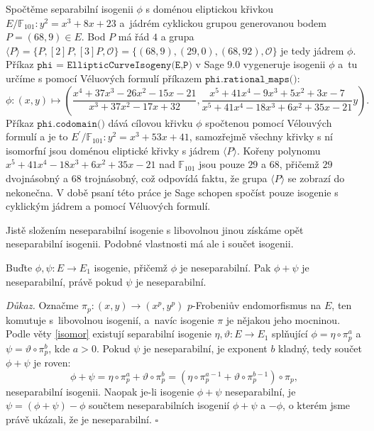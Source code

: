 \documentclass[12pt]{report}
\begin{document}
\begin{priklad}
Spočtěme separabilní isogenii $\phi$ s doménou eliptickou křivkou $E/\mathbb{F}_{101} : y^2 = x^3+8x+23$ a~jádrém cyklickou grupou generovanou bodem $P =(68,9) \in E$. Bod $P$ má řád $4$ a grupa $\langle P \rangle = \lbrace P,[2]P,[3]P,\mathcal{O}\rbrace = \lbrace (68,9),(29,0), (68,92),\mathcal{O} \rbrace$ je tedy jádrem $\phi$. Příkaz $\texttt{phi = EllipticCurveIsogeny(E,P)}$ v Sage 9.0 vygeneruje isogenii $\phi$ a~tu určíme s pomocí Véluových formulí příkazem $\texttt{phi.rational\_maps()}$:
\begin{equation*}
\phi : (x,y) \longmapsto \left(\frac{x^4 + 37 x^3 - 26 x^2 - 15x - 21}{x^3 + 37 x^2 - 17 x + 32},\frac{x^5 + 41 x^4 - 9 x^3 + 5 x^2 + 3x - 7}{x^5 + 41 x^4 - 18 x^3 + 6 x^2 + 35x - 21} y  \right). 
\end{equation*}
Příkaz $\texttt{phi.codomain()}$ dává cílovou křivku $\phi$ spočtenou pomocí Vélouvých formulí a je to $E^\prime/\mathbb{F}_{101} : y^2 = x^3 + 53 x + 41$, samozřejmě všechny křivky s ní isomorfní jsou doménou eliptické křivky s jádrem $\langle P \rangle$. Kořeny polynomu $x^5 + 41 x^4 - 18 x^3 + 6 x^2 + 35x - 21$ nad $\mathbb{F}_{101}$ jsou pouze $29$ a $68$, přičemž $29$ dvojnásobný a $68$ trojnásobný, což odpovídá faktu, že grupa $\langle P \rangle$ se zobrazí do nekonečna. V době psaní této práce je Sage schopen spočíst pouze isogenie s cyklickým jádrem a pomocí Véluových formulí.
\end{priklad}

Jistě složením neseparabilní isogenie s libovolnou jinou získáme opět neseparabilní isogenii. Podobné vlastnosti má ale i součet isogenii.
\begin{veta}\label{separsum}
Buďte $\phi,\psi : E \longrightarrow E_1$ isogenie, přičemž $\phi$ je neseparabilní. Pak $\phi+\psi$ je neseparabilní, právě pokud $\psi$ je neseparabilní.
\end{veta}
\noindent \textit{Důkaz.} Označme $\pi_p : (x,y) \rightarrow (x^p,y^p)$ $p$-Frobeniův endomorfismus na $E$, ten komutuje s~libovolnou isogenií, a~navíc isogenie $\pi$ je nějakou jeho mocninou. Podle věty \ref{isomor} existují separabilní isogenie $\eta,\vartheta : E \longrightarrow E_1$ splňující $\phi =  \eta \circ \pi_p ^a$ a $\psi = \vartheta\circ \pi_p ^b$, kde $a > 0$. Pokud $\psi$ je neseparabilní, je exponent $b$ kladný, tedy součet $\phi+\psi$ je roven:
\begin{equation*}
\phi+\psi = \eta \circ \pi_p ^a +\vartheta\circ \pi_p ^b = (\eta \circ \pi_p ^{a-1} + \vartheta \circ \pi_p ^{b-1}) \circ \pi_p, 
\end{equation*}
neseparabilní isogenii. Naopak je-li isogenie $\phi+\psi$ neseparabilní, je $\psi = (\phi+\psi) - \phi$ součtem neseparabilních isogenií $\phi+\psi$ a $-\phi$, o kterém jsme právě ukázali, že je neseparabilní. \hfill $\square$\\
\end{document}
